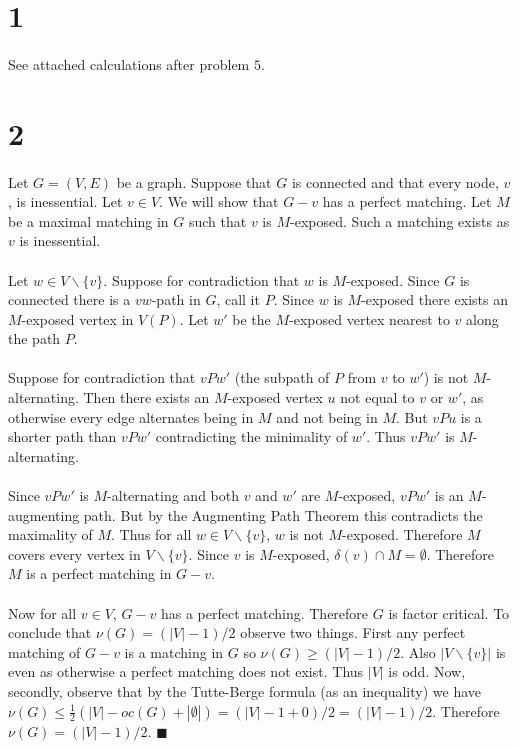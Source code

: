 \documentclass[letterpaper,12pt,oneside,onecolumn]{report}
\begin{document}
\section*{1}
\paragraph{}
See attached calculations after problem $5$.
\section*{2}
\paragraph{}
Let $G = (V,E)$ be a graph. Suppose that $G$ is connected and that every node, $v$, is inessential. Let $v \in V$. We will show that $G-v$ has a perfect matching. Let $M$ be a maximal matching in $G$ such that $v$ is $M$-exposed. Such a matching exists as $v$ is inessential. 
\paragraph{}
Let $w\in V\backslash \{v\}$. Suppose for contradiction that $w$ is $M$-exposed. Since $G$ is connected there is a $vw$-path in $G$, call it $P$. Since $w$ is $M$-exposed there exists an $M$-exposed vertex in $V(P)$. Let $w'$ be the $M$-exposed vertex nearest to $v$ along the path $P$.
\paragraph{}
Suppose for contradiction that $vPw'$ (the subpath of $P$ from $v$ to $w'$) is not $M$-alternating. Then there exists an $M$-exposed vertex $u$ not equal to $v$ or $w'$, as otherwise every edge alternates being in $M$ and not being in $M$. But $vPu$ is a shorter path than $vPw'$ contradicting the minimality of $w'$. Thus $vPw'$ is $M$-alternating.
\paragraph{}
Since $vPw'$ is $M$-alternating and both $v$ and $w'$ are $M$-exposed, $vPw'$ is an $M$-augmenting path. But by the Augmenting Path Theorem this contradicts the maximality of $M$. Thus for all $w \in V\backslash \{v\}$, $w$ is not $M$-exposed. Therefore $M$ covers every vertex in $V\backslash \{v\}$. Since $v$ is $M$-exposed, $\delta(v) \cap M = \emptyset$. Therefore $M$ is a perfect matching in $G-v$.
\paragraph{}
Now for all $v \in V$, $G-v$ has a perfect matching. Therefore $G$ is factor critical. To conclude that $\nu(G) = (|V| - 1)/2$ observe two things. First any perfect matching of $G-v$ is a matching in $G$ so $\nu(G) \geq (|V|-1)/2$. Also $|V\backslash \{v\}|$ is even as otherwise a perfect matching does not exist. Thus $|V|$ is odd. Now, secondly, observe that by the Tutte-Berge formula (as an inequality) we have $\nu(G) \leq \frac{1}{2}(|V| - oc(G) + |\emptyset|) = (|V| - 1 + 0)/2 = (|V| - 1)/2$. Therefore $\nu(G) = (|V|-1)/2$. $\blacksquare$
\end{document}
